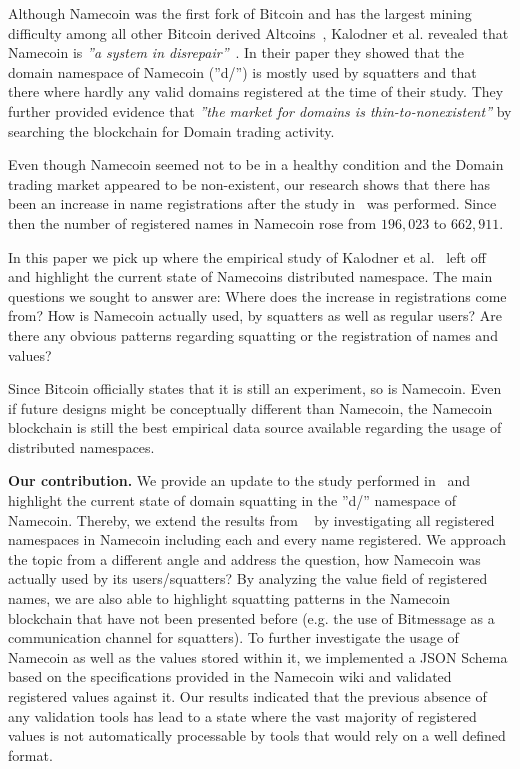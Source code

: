 \documentclass{llncs}
\begin{document}
Although Namecoin was the first fork of Bitcoin and has the largest mining difficulty among all other Bitcoin derived Altcoins~\cite{online:bitinfocharts}, Kalodner et al. revealed that Namecoin is \textit{''a system in disrepair''}~\cite{kalodner2015namecoinempirical}.
In their paper they showed that the domain namespace of Namecoin (''d/'') is mostly used by squatters and that there where hardly any valid domains registered at the time of their study. They further provided evidence that \textit{''the market for domains is thin-to-nonexistent''} by searching the blockchain for Domain trading activity.

Even though Namecoin seemed not to be in a healthy condition and the Domain trading market appeared to be non-existent, our research shows that there has been an increase in name registrations after the study in~\cite{kalodner2015namecoinempirical} was performed. 
Since then the number of registered names in Namecoin rose from $196,023$ to $662,911$. 

In this paper we pick up where the empirical study of Kalodner et al.~\cite{kalodner2015namecoinempirical} left off and highlight the current state of Namecoins distributed namespace.  
The main questions we sought to answer are: Where does the increase in registrations come from? How is Namecoin actually used, by squatters as well as regular users? Are there any obvious patterns regarding squatting or the registration of names and values? 

Since Bitcoin officially states that it is still an experiment, so is Namecoin. 
Even if future designs might be conceptually different than Namecoin, the Namecoin blockchain is still the best empirical data source available regarding the usage of distributed namespaces.

\textbf{Our contribution.} We provide an update to the study performed in~\cite{kalodner2015namecoinempirical} and highlight the current state of domain squatting in the ''d/'' namespace of Namecoin. 
Thereby, we extend the results from ~\cite{kalodner2015namecoinempirical} by investigating all registered namespaces in Namecoin including each and every name registered. 
We approach the topic from a different angle and address the question, how Namecoin was actually used by its users/squatters?
By analyzing the value field of registered names, we are also able to highlight squatting patterns in the Namecoin blockchain that have not been presented before (e.g. the use of Bitmessage as a communication channel for squatters).
To further investigate the usage of Namecoin as well as the values stored within it, we implemented a JSON Schema based on the specifications provided in the Namecoin wiki \cite{online:namecoin} and validated registered values against it. Our results indicated that the previous absence of any validation tools has lead to a state where the vast majority of registered values is not automatically processable by tools that would rely on a well defined format.  
\end{document}
